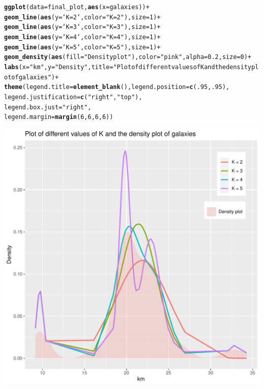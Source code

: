 \documentclass{article}\usepackage[]{graphicx}\usepackage[]{color}
\makeatletter
\def\maxwidth{ %
  \ifdim\Gin@nat@width>\linewidth
    \linewidth
  \else
    \Gin@nat@width
  \fi
}
\newcommand{\hlnum}[1]{\textcolor[rgb]{0.686,0.059,0.569}{#1}}%
\newcommand{\hlstr}[1]{\textcolor[rgb]{0.192,0.494,0.8}{#1}}%
\newcommand{\hlopt}[1]{\textcolor[rgb]{0,0,0}{#1}}%
\newcommand{\hlstd}[1]{\textcolor[rgb]{0.345,0.345,0.345}{#1}}%
\newcommand{\hlkwc}[1]{\textcolor[rgb]{0.333,0.667,0.333}{#1}}%
\newcommand{\hlkwd}[1]{\textcolor[rgb]{0.737,0.353,0.396}{\textbf{#1}}}%
\newenvironment{kframe}{%
 \def\at@end@of@kframe{}%
 \ifinner\ifhmode%
  \def\at@end@of@kframe{\end{minipage}}%
  \begin{minipage}{\columnwidth}%
 \fi\fi%
 \def\FrameCommand##1{\hskip\@totalleftmargin \hskip-\fboxsep
 \colorbox{shadecolor}{##1}\hskip-\fboxsep
     \hskip-\linewidth \hskip-\@totalleftmargin \hskip\columnwidth}%
 \MakeFramed {\advance\hsize-\width
   \@totalleftmargin\z@ \linewidth\hsize
   \@setminipage}}%
 {\par\unskip\endMakeFramed%
 \at@end@of@kframe}
\newenvironment{knitrout}{}{} %
\makeatother
\begin{document}
\begin{knitrout}
\begin{kframe}
\begin{alltt}
\hlkwd{ggplot}\hlstd{(}\hlkwc{data} \hlstd{= final_plot,} \hlkwd{aes}\hlstd{(}\hlkwc{x} \hlstd{= galaxies))} \hlopt{+}
  \hlkwd{geom_line}\hlstd{(}\hlkwd{aes}\hlstd{(}\hlkwc{y} \hlstd{= `K = 2`,} \hlkwc{color} \hlstd{=} \hlstr{"K = 2"}\hlstd{),} \hlkwc{size} \hlstd{=} \hlnum{1}\hlstd{)} \hlopt{+}
  \hlkwd{geom_line}\hlstd{(}\hlkwd{aes}\hlstd{(}\hlkwc{y} \hlstd{= `K = 3`,} \hlkwc{color} \hlstd{=} \hlstr{"K = 3"}\hlstd{),} \hlkwc{size} \hlstd{=} \hlnum{1}\hlstd{)} \hlopt{+}
  \hlkwd{geom_line}\hlstd{(}\hlkwd{aes}\hlstd{(}\hlkwc{y} \hlstd{= `K = 4`,} \hlkwc{color} \hlstd{=} \hlstr{"K = 4"}\hlstd{),} \hlkwc{size} \hlstd{=} \hlnum{1}\hlstd{)} \hlopt{+}
  \hlkwd{geom_line}\hlstd{(}\hlkwd{aes}\hlstd{(}\hlkwc{y} \hlstd{= `K = 5`,} \hlkwc{color} \hlstd{=} \hlstr{"K = 5"}\hlstd{),} \hlkwc{size} \hlstd{=} \hlnum{1}\hlstd{)} \hlopt{+}
  \hlkwd{geom_density}\hlstd{(}\hlkwd{aes}\hlstd{(}\hlkwc{fill} \hlstd{=} \hlstr{"Density plot"}\hlstd{),} \hlkwc{color} \hlstd{=} \hlstr{"pink"}\hlstd{,} \hlkwc{alpha} \hlstd{=} \hlnum{0.2}\hlstd{,} \hlkwc{size} \hlstd{=} \hlnum{0}\hlstd{)} \hlopt{+}
  \hlkwd{labs}\hlstd{(}\hlkwc{x} \hlstd{=} \hlstr{"km"}\hlstd{,} \hlkwc{y} \hlstd{=} \hlstr{"Density"}\hlstd{,}\hlkwc{title}\hlstd{=}\hlstr{"Plot of different values of K and the density plot of galaxies"}\hlstd{)} \hlopt{+}
  \hlkwd{theme}\hlstd{(}\hlkwc{legend.title} \hlstd{=} \hlkwd{element_blank}\hlstd{(),}\hlkwc{legend.position} \hlstd{=} \hlkwd{c}\hlstd{(}\hlnum{.95}\hlstd{,} \hlnum{.95}\hlstd{),}
        \hlkwc{legend.justification} \hlstd{=} \hlkwd{c}\hlstd{(}\hlstr{"right"}\hlstd{,} \hlstr{"top"}\hlstd{),}
        \hlkwc{legend.box.just} \hlstd{=} \hlstr{"right"}\hlstd{,}
        \hlkwc{legend.margin} \hlstd{=} \hlkwd{margin}\hlstd{(}\hlnum{6}\hlstd{,} \hlnum{6}\hlstd{,} \hlnum{6}\hlstd{,} \hlnum{6}\hlstd{))}
\end{alltt}
\end{kframe}
\includegraphics[width=\maxwidth]{figure/unnamed-chunk-7-3} 

\end{knitrout}
\end{document}
